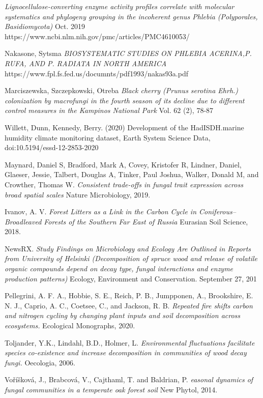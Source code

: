 \documentclass[12pt]{article}
\begin{document}
\begin{thebibliography}{9}
\emph{Lignocellulose-converting enzyme activity profiles correlate with molecular systematics and phylogeny grouping in the incoherent genus Phlebia (Polyporales, Basidiomycota)}
Oct. 2019
https://www.ncbi.nlm.nih.gov/pmc/articles/PMC4610053/

Nakasone, Sytsma
\emph{BIOSYSTEMATIC STUDIES ON PHLEBIA ACERINA,P. RUFA, AND P. RADIATA IN NORTH AMERICA }
https://www.fpl.fs.fed.us/documnts/pdf1993/nakas93a.pdf


Marciszewska, Szczepkowski, Otreba
\emph{Black cherry (Prunus serotina Ehrh.) colonization
by macrofungi in the fourth season of its decline due
to different control measures in the Kampinos National Park}
Vol. 62 (2), 78-87

Willett, Dunn, Kennedy, Berry. (2020) Development of the HadISDH.marine humidity climate monitoring dataset, Earth System Science Data, doi:10.5194/essd-12-2853-2020

 Maynard, Daniel S, Bradford, Mark A, Covey, Kristofer R, Lindner, Daniel, Glaeser, Jessie, Talbert, Douglas A, Tinker, Paul Joshua, Walker, Donald M, and Crowther, Thomas W. 
 \emph{Consistent trade-offs in fungal trait expression across broad spatial scales}
 Nature Microbiology, 2019.

Ivanov, A. V.
\emph{Forest Litters as a Link in the Carbon Cycle in Coniferous–Broadleaved Forests of the Southern Far East of Russia}
Eurasian Soil Science, 2018.

NewsRX.
\emph{Study Findings on Microbiology and Ecology Are Outlined in Reports from University of Helsinki (Decomposition of spruce wood and release of volatile organic compounds depend on decay type, fungal interactions and enzyme production patterns)}
Ecology, Environment and Conservation. September 27, 201

Pellegrini, A. F. A., Hobbie, S. E., Reich, P. B., Jumpponen, A., Brookshire, E. N. J., Caprio, A. C., Coetsee, C., and Jackson, R. B.
\emph{Repeated fire shifts carbon and nitrogen cycling by changing plant inputs and soil decomposition across ecosystems.}
Ecological Monographs, 2020.

Toljander, Y.K., Lindahl, B.D., Holmer, L.
\emph{Environmental fluctuations facilitate species co-existence and increase decomposition in communities of wood decay fungi.}
Oecologia, 2006.

Voříšková, J., Brabcová, V., Cajthaml, T. and Baldrian, P. 
\emph{easonal dynamics of fungal communities in a temperate oak forest soil}
New Phytol, 2014.


\end{thebibliography}{}
\end{document}
